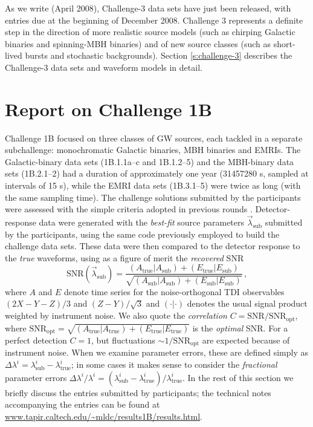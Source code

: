 \documentclass{iopart}
\begin{document}
As we write (April 2008), Challenge-3 data sets have just been released, with entries due at the beginning of December 2008. Challenge 3 represents a definite step in the direction of more realistic source models (such as chirping Galactic binaries and spinning-MBH binaries) and of new source classes (such as short-lived bursts and stochastic backgrounds). Section \ref{s:challenge-3} describes the Challenge-3 data sets and waveform models in detail.

\section{Report on Challenge 1B}
\label{s:challenge-1b}

Challenge 1B focused on three classes of GW sources, each tackled in a separate subchallenge: monochromatic Galactic binaries, MBH binaries and EMRIs. The Galactic-binary data sets (1B.1.1a--c and 1B.1.2--5) and the MBH-binary data sets (1B.2.1--2) had a duration of approximately one year (31457280 s, sampled at intervals of 15 s), while the EMRI data sets (1B.3.1--5) were twice as long (with the same sampling time). The challenge solutions submitted by the participants were assessed with the simple criteria adopted in previous rounds \cite{mldcgwdaw1, mldcamaldi2}. Detector-response data were generated with the \emph{best-fit} source parameters $\vec{\lambda}_\mathrm{sub}$ submitted by the participants, using the same code previously employed to build the challenge data sets. These data were then compared to the detector response to the \emph{true} waveforms, using as a figure of merit the \emph{recovered} SNR
%
\begin{equation}
\mathrm{SNR}(\vec{\lambda}_\mathrm{sub}) = \frac{(A_\mathrm{true}|A_\mathrm{sub}) + (E_\mathrm{true}|E_\mathrm{sub})} {\sqrt{(A_\mathrm{sub}|A_\mathrm{sub}) + (E_\mathrm{sub}|E_\mathrm{sub})}}\,,
\label{e:SNR}
\end{equation}
%
where $A$ and $E$ denote time series for the noise-orthogonal TDI observables $(2X - Y - Z)/3$ and $(Z - Y)/\sqrt{3}$ \cite{sensitivity} and $(\cdot|\cdot)$ denotes the usual signal product weighted by instrument noise.
We also quote the \emph{correlation} $C = \mathrm{SNR} / \mathrm{SNR}_\mathrm{opt}$, where 
$\mathrm{SNR}_\mathrm{opt} = \sqrt{(A_\mathrm{true}|A_\mathrm{true}) + (E_\mathrm{true}|E_\mathrm{true})}$ is the \emph{optimal} SNR. For a perfect detection $C = 1$, but fluctuations $\sim 1 / \mathrm{SNR}_\mathrm{opt}$ are expected because of instrument noise. When we examine parameter errors, these are defined simply as
$\Delta\lambda^i = \lambda^i_\mathrm{sub} - \lambda^i_\mathrm{true}$; in some cases it makes sense to consider the \emph{fractional} parameter errors $\Delta \lambda^i / \lambda^i = (\lambda^i_\mathrm{sub} - \lambda^i_\mathrm{true}) / \lambda^i_\mathrm{true}$.
In the rest of this section we briefly discuss the entries submitted by participants; the technical notes accompanying the entries can be found at \url{www.tapir.caltech.edu/~mldc/results1B/results.html}.
\end{document}
